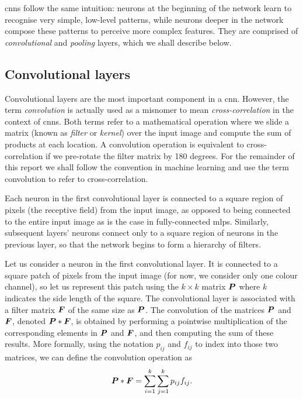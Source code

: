 \documentclass[../main.tex]{subfiles}
\begin{document}
\Glspl{cnn} follow the same intuition: neurons at the beginning of the network learn to recognise very simple, low-level patterns, while neurons deeper in the network compose these patterns to perceive more complex features.
They are comprised of \emph{convolutional} and \emph{pooling} layers, which we shall describe below.

\subsection{Convolutional layers}
Convolutional layers are the most important component in a \gls{cnn}.
However, the term \emph{convolution} is actually used as a misnomer to mean \emph{cross-correlation} in the context of \glspl{cnn}.
Both terms refer to a mathematical operation where we slide a matrix (known as \emph{filter} or \emph{kernel}) over the input image and compute the sum of products at each location.
A convolution operation is equivalent to cross-correlation if we pre-rotate the filter matrix by 180 degrees.
For the remainder of this report we shall follow the convention in machine learning and use the term convolution to refer to cross-correlation.

Each neuron in the first convolutional layer is connected to a square region of pixels (the receptive field) from the input image, as opposed to being connected to the entire input image as is the case in fully-connected \glspl{mlp}.
Similarly, subsequent layers' neurons connect only to a square region of neurons in the previous layer, so that the network begins to form a hierarchy of filters.

Let us consider a neuron in the first convolutional layer.
It is connected to a square patch of pixels from the input image (for now, we consider only one colour channel), so let us represent this patch using the $k\times k$ matrix ${\bm{P}}$ where $k$ indicates the side length of the square.
The convolutional layer is associated with a filter matrix ${\bm{F}}$ of the same size as ${\bm{P}}$.
The convolution of the matrices ${\bm{P}}$ and ${\bm{F}}$, denoted ${\bm{P}} * {\bm{F}}$, is obtained by performing a pointwise multiplication of the corresponding elements in ${\bm{P}}$ and ${\bm{F}}$, and then computing the sum of these results.
More formally, using the notation $p_{ij}$ and $f_{ij}$ to index into those two matrices, we can define the convolution operation as
\begin{equation}
    {\bm{P}} * {\bm{F}} = \sum_{i=1}^k \sum_{j=1}^k p_{ij} f_{ij}.
\end{equation}
\end{document}
